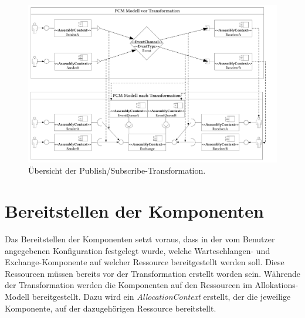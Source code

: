 \begin{figure}
\center
  \includegraphics[width=1.4\textwidth, angle=90]{images/transformation/transformationSystemPubSub.pdf}
  \caption{Übersicht der Publish/Subscribe-Transformation.}
  \label{img:transformationPubSub}
\end{figure}


\section{Bereitstellen der Komponenten}
Das Bereitstellen der Komponenten setzt voraus, dass in der vom Benutzer angegebenen Konfiguration festgelegt wurde, welche Warteschlangen- und Exchange-Komponente auf welcher Ressource bereitgestellt werden soll. Diese Ressourcen müssen bereits vor der Transformation erstellt worden sein. Währende der Transformation werden die Komponenten auf den Ressourcen im Allokations-Modell bereitgestellt. Dazu wird ein \emph{AllocationContext} erstellt, der die jeweilige Komponente, auf der dazugehörigen Ressource bereitstellt.

